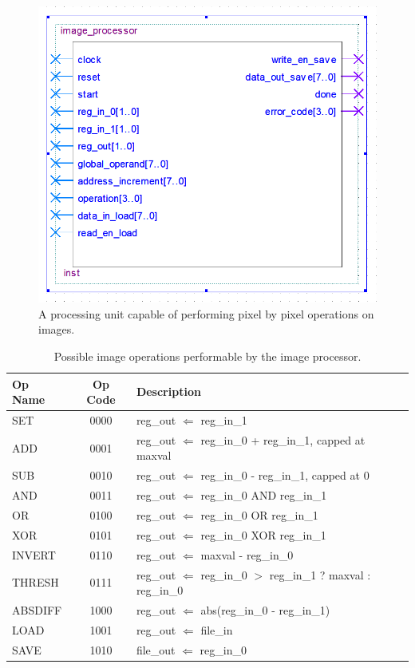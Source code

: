 \documentclass[a4paper, 10pt, titlepage]{article}
\begin{document}
\begin{figure}
    \centering
    \includegraphics[width=0.5\linewidth]{image_processor_entity.PNG}
    \caption{A processing unit capable of performing pixel by pixel operations on images.}
    \label{fig:image_processor}
\end{figure}

\begin{table}
    \centering
    \begin{tabular}[c]{ l | c | p{10cm} }
        \textbf{Op Name} & \textbf{Op Code} & \textbf{Description} \\
        \hline
        SET & 0000 & reg\_out $\Leftarrow$ reg\_in\_1 \\
        ADD & 0001 & reg\_out $\Leftarrow$ reg\_in\_0 + reg\_in\_1, capped at maxval \\
        SUB & 0010 & reg\_out $\Leftarrow$ reg\_in\_0 - reg\_in\_1, capped at 0 \\
        AND & 0011 & reg\_out $\Leftarrow$ reg\_in\_0 AND reg\_in\_1 \\
        OR & 0100 & reg\_out $\Leftarrow$ reg\_in\_0 OR reg\_in\_1 \\
        XOR & 0101 & reg\_out $\Leftarrow$ reg\_in\_0 XOR reg\_in\_1 \\
        INVERT & 0110 & reg\_out $\Leftarrow$ maxval - reg\_in\_0 \\
        THRESH & 0111 & reg\_out $\Leftarrow$ reg\_in\_0 $>$ reg\_in\_1 ? maxval : reg\_in\_0 \\
        ABSDIFF & 1000 & reg\_out $\Leftarrow$ abs(reg\_in\_0 - reg\_in\_1) \\
        LOAD & 1001 & reg\_out $\Leftarrow$ file\_in \\
        SAVE & 1010 & file\_out $\Leftarrow$ reg\_in\_0 \\
    \end{tabular}
    \caption{Possible image operations performable by the image processor.}
    \label{tab:image_operations}
\end{table}
\end{document}
